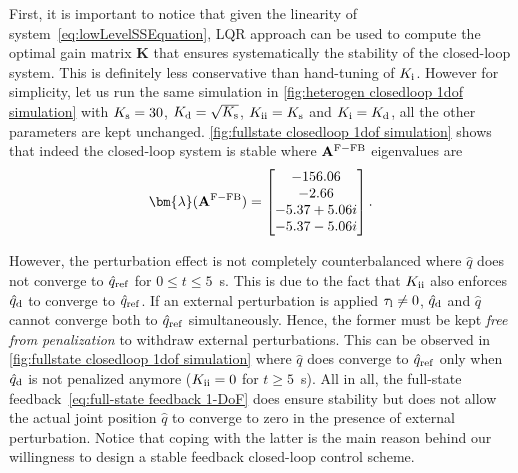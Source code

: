 First, it is important to notice that given the linearity of system~\eqref{eq:lowLevelSSEquation}, LQR approach can be used to compute the optimal gain matrix $\mathbf{K}$ that ensures systematically the stability of the closed-loop system. This is definitely less conservative than hand-tuning of $K_{\rm i}$. However for simplicity, let us run the same simulation in \cref{fig:heterogen closedloop 1dof simulation} with $K_{\rm s} = 30$, $K_{\rm d} = \sqrt{K_{\rm s}}$,  $K_{\rm ii} = K_{\rm s}$ and $K_{\rm i} = K_{\rm d}$, all the other parameters are kept unchanged. \cref{fig:fullstate closedloop 1dof simulation} shows that indeed the closed-loop system is stable where $\mathbf{A}^{\rm F-FB}$ eigenvalues are 
\begin{equation}
	\bm{\lambda}(\mathbf{A}^{\rm F-FB}) = \begin{bmatrix}
		-156.06	\\ -2.66 \\ -5.37 + 5.06i \\ -5.37 - 5.06i
	\end{bmatrix}.
\end{equation}

However, the perturbation effect is not completely counterbalanced where $\hat{q}$ does not converge to $\hat{q}_{\rm ref}$  for $0\leq t\leq 5$~s. This is due to the fact that $K_{\rm ii}$ also enforces $\hat{q}_{\rm d}$ to converge to $\hat{q}_{\rm ref}$. If an external perturbation is applied $\tau_{\rm l}\neq 0$, $\hat{q}_{\rm d}$ and $\hat{q}$ cannot converge both to $\hat{q}_{\rm ref}$ simultaneously. Hence, the former must be kept \emph{free from penalization} to withdraw external perturbations. This can be observed in \cref{fig:fullstate closedloop 1dof simulation} where $\hat{q}$ does converge to $\hat{q}_{\rm ref}$ only when $\hat{q}_{\rm d}$ is not penalized anymore ($K_{\rm ii}= 0$ for $t\geq5$~s).  All in all, the full-state feedback~\eqref{eq:full-state feedback 1-DoF} does ensure stability but does not allow the actual joint position $\hat{q}$ to converge to zero in the presence of external perturbation. Notice that coping with the latter is the main reason behind our willingness to design a stable feedback closed-loop control scheme.


